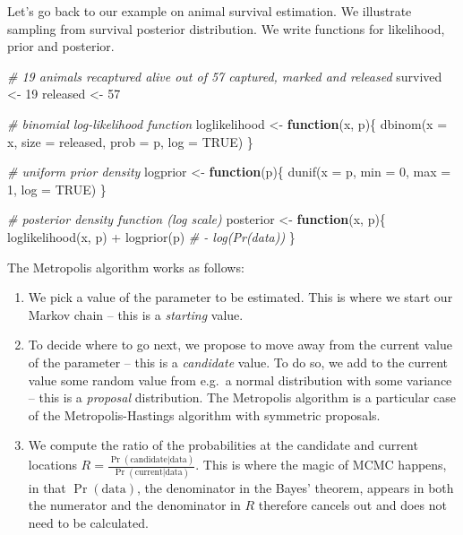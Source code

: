 \documentclass[
  12pt,
]{krantz}
\newenvironment{Shaded}{\begin{snugshade}}{\end{snugshade}}
\newcommand{\AttributeTok}[1]{\textcolor[rgb]{0.77,0.63,0.00}{#1}}
\newcommand{\CommentTok}[1]{\textcolor[rgb]{0.56,0.35,0.01}{\textit{#1}}}
\newcommand{\ConstantTok}[1]{\textcolor[rgb]{0.00,0.00,0.00}{#1}}
\newcommand{\ControlFlowTok}[1]{\textcolor[rgb]{0.13,0.29,0.53}{\textbf{#1}}}
\newcommand{\DecValTok}[1]{\textcolor[rgb]{0.00,0.00,0.81}{#1}}
\newcommand{\FunctionTok}[1]{\textcolor[rgb]{0.00,0.00,0.00}{#1}}
\newcommand{\NormalTok}[1]{#1}
\newcommand{\OtherTok}[1]{\textcolor[rgb]{0.56,0.35,0.01}{#1}}
\newcommand{\SpecialCharTok}[1]{\textcolor[rgb]{0.00,0.00,0.00}{#1}}
\begin{document}
Let's go back to our example on animal survival estimation. We illustrate sampling from survival posterior distribution. We write functions for likelihood, prior and posterior.

\begin{Shaded}
\begin{Highlighting}[]
\CommentTok{\# 19 animals recaptured alive out of 57 captured, marked and released}
\NormalTok{survived }\OtherTok{\textless{}{-}} \DecValTok{19}
\NormalTok{released }\OtherTok{\textless{}{-}} \DecValTok{57}

\CommentTok{\# binomial log{-}likelihood function}
\NormalTok{loglikelihood }\OtherTok{\textless{}{-}} \ControlFlowTok{function}\NormalTok{(x, p)\{}
  \FunctionTok{dbinom}\NormalTok{(}\AttributeTok{x =}\NormalTok{ x, }\AttributeTok{size =}\NormalTok{ released, }\AttributeTok{prob =}\NormalTok{ p, }\AttributeTok{log =} \ConstantTok{TRUE}\NormalTok{)}
\NormalTok{\}}

\CommentTok{\# uniform prior density}
\NormalTok{logprior }\OtherTok{\textless{}{-}} \ControlFlowTok{function}\NormalTok{(p)\{}
  \FunctionTok{dunif}\NormalTok{(}\AttributeTok{x =}\NormalTok{ p, }\AttributeTok{min =} \DecValTok{0}\NormalTok{, }\AttributeTok{max =} \DecValTok{1}\NormalTok{, }\AttributeTok{log =} \ConstantTok{TRUE}\NormalTok{)}
\NormalTok{\}}

\CommentTok{\# posterior density function (log scale)}
\NormalTok{posterior }\OtherTok{\textless{}{-}} \ControlFlowTok{function}\NormalTok{(x, p)\{}
  \FunctionTok{loglikelihood}\NormalTok{(x, p) }\SpecialCharTok{+} \FunctionTok{logprior}\NormalTok{(p) }\CommentTok{\# {-} log(Pr(data))}
\NormalTok{\}}
\end{Highlighting}
\end{Shaded}

The Metropolis algorithm works as follows:

\begin{enumerate}
\def\labelenumi{\arabic{enumi}.}
\item
  We pick a value of the parameter to be estimated. This is where we start our Markov chain -- this is a \emph{starting} value.
\item
  To decide where to go next, we propose to move away from the current value of the parameter -- this is a \emph{candidate} value. To do so, we add to the current value some random value from e.g.~a normal distribution with some variance -- this is a \emph{proposal} distribution. The Metropolis algorithm is a particular case of the Metropolis-Hastings algorithm with symmetric proposals.
\item
  We compute the ratio of the probabilities at the candidate and current locations \(R=\displaystyle{\frac{{\Pr(\text{candidate}|\text{data})}}{{\Pr(\text{current}|\text{data})}}}\). This is where the magic of MCMC happens, in that \(\Pr(\text{data})\), the denominator in the Bayes' theorem, appears in both the numerator and the denominator in \(R\) therefore cancels out and does not need to be calculated.
\end{enumerate}
\end{document}
